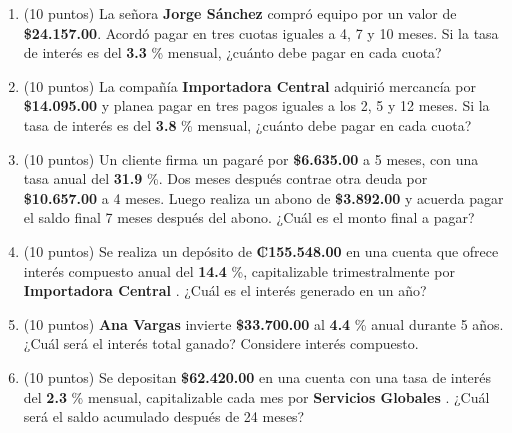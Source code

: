 \documentclass[10pt]{article}
\begin{document}
\begin{enumerate}[leftmargin=*, label=\textbf{\arabic*.}]
  \item (10 puntos) La señora \textbf{ Jorge Sánchez } compró equipo por un valor de \textbf{\$\num{ 24,157.00 }}. Acordó pagar en tres cuotas iguales a 4, 7 y 10 meses. Si la tasa de interés es del \textbf{ 3.3 }\% mensual, ¿cuánto debe pagar en cada cuota?

  \vspace{0.5cm}

  \item (10 puntos) La compañía \textbf{ Importadora Central } adquirió mercancía por \textbf{\$\num{ 14,095.00 }} y planea pagar en tres pagos iguales a los 2, 5 y 12 meses. Si la tasa de interés es del \textbf{ 3.8 }\% mensual, ¿cuánto debe pagar en cada cuota?

  \vspace{0.5cm}

  \item (10 puntos) Un cliente firma un pagaré por \textbf{\$\num{ 6,635.00 }} a 5 meses, con una tasa anual del \textbf{ 31.9 }\%. Dos meses después contrae otra deuda por \textbf{\$\num{ 10,657.00 }} a 4 meses. Luego realiza un abono de \textbf{\$\num{ 3,892.00 }} y acuerda pagar el saldo final 7 meses después del abono. ¿Cuál es el monto final a pagar?

  \vspace{0.5cm}

  \item (10 puntos) Se realiza un depósito de \textbf{₡\num{ 155.548.00 }} en una cuenta que ofrece interés compuesto anual del \textbf{ 14.4 }\%, capitalizable trimestralmente por \textbf{ Importadora Central }. ¿Cuál es el interés generado en un año?

  \vspace{0.5cm}

  \item (10 puntos) \textbf{ Ana Vargas } invierte \textbf{\$\num{ 33,700.00 }} al \textbf{ 4.4 }\% anual durante 5 años. ¿Cuál será el interés total ganado? Considere interés compuesto.

  \vspace{0.5cm}

  \item (10 puntos) Se depositan \textbf{\$\num{ 62,420.00 }} en una cuenta con una tasa de interés del \textbf{ 2.3 }\% mensual, capitalizable cada mes por \textbf{ Servicios Globales }. ¿Cuál será el saldo acumulado después de 24 meses?
\end{enumerate}



\newpage
\end{document}

